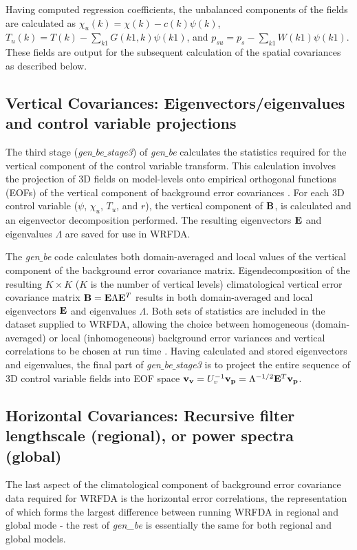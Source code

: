 Having computed regression coefficients, the unbalanced components of the fields are 
calculated as $\chi_{u}(k)=\chi(k)-c(k)\psi(k)$, $T_{u}(k)=T(k)-\sum_{k1}G(k1,k)\psi(k1)$, 
and $p_{su}=p_s - \sum_{k1} W(k1)\psi(k1)$. These fields are output for the 
subsequent calculation of the spatial covariances as described below.

\subsection{Vertical Covariances: Eigenvectors/eigenvalues and 
control variable projections} 

The third stage ({\it gen$\_$be$\_$stage3}) of {\it gen$\_$be}
calculates the statistics required for the vertical component of the
control variable transform. This calculation involves the projection
of 3D fields on model-levels onto empirical orthogonal functions
(EOFs) of the vertical component of background error covariances
\citet{barker04}. For each 3D control variable ($\psi$, $\chi_u$,
$T_u$, and $r$), the vertical component of ${\bf B}$, is calculated
and an eigenvector decomposition performed. The resulting eigenvectors
${\bf E}$ and eigenvalues $\Lambda$ are saved for use in WRFDA.

The {\it gen$\_$be} code calculates both domain-averaged and local
values of the vertical component of the background error covariance
matrix. Eigendecomposition of the resulting $K\times K$ ($K$ is the number of 
vertical levels) climatological vertical error covariance matrix ${\bf
B}={\bf E}{\Lambda}{\bf E}^{T}$ results in both domain-averaged and
local eigenvectors $\bf E$ and eigenvalues $\Lambda$. Both sets of
statistics are included in the dataset supplied to WRFDA, allowing
the choice between homogeneous (domain-averaged) or local
(inhomogeneous) background error variances and vertical correlations
to be chosen at run time \citet{barker04}.
Having calculated and stored eigenvectors and eigenvalues, the final
part of {\it gen$\_$be$\_$stage3} is to project the entire sequence of
3D control variable fields into EOF space ${\bf v_v}=U_{v}^{-1}{\bf
v_p}=\Lambda^{-1/2}{\bf E}^{T} {\bf v_p}$.

\subsection{Horizontal Covariances: Recursive filter lengthscale (regional), or power 
spectra (global)}

The last aspect of the climatological component of background error
covariance data required for WRFDA is the horizontal error
correlations, the representation of which forms the largest difference
between running WRFDA in regional and global mode - the rest of 
{\it gen\_be} is essentially the same for both regional and global models.

